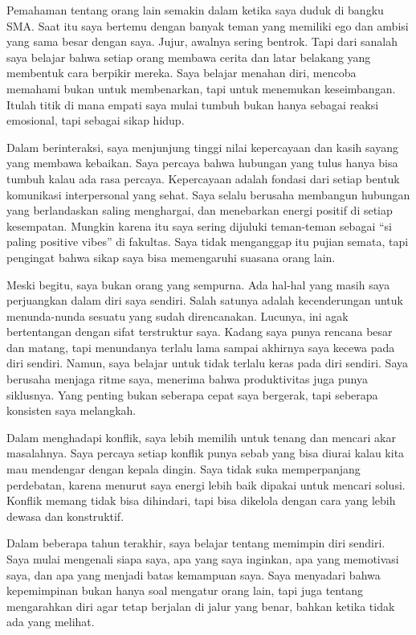 \documentclass[
  letterpaper,
  DIV=11,
  numbers=noendperiod]{scrreprt}
\begin{document}
Pemahaman tentang orang lain semakin dalam ketika saya duduk di bangku
SMA. Saat itu saya bertemu dengan banyak teman yang memiliki ego dan
ambisi yang sama besar dengan saya. Jujur, awalnya sering bentrok. Tapi
dari sanalah saya belajar bahwa setiap orang membawa cerita dan latar
belakang yang membentuk cara berpikir mereka. Saya belajar menahan diri,
mencoba memahami bukan untuk membenarkan, tapi untuk menemukan
keseimbangan. Itulah titik di mana empati saya mulai tumbuh bukan hanya
sebagai reaksi emosional, tapi sebagai sikap hidup.

Dalam berinteraksi, saya menjunjung tinggi nilai kepercayaan dan kasih
sayang yang membawa kebaikan. Saya percaya bahwa hubungan yang tulus
hanya bisa tumbuh kalau ada rasa percaya. Kepercayaan adalah fondasi
dari setiap bentuk komunikasi interpersonal yang sehat. Saya selalu
berusaha membangun hubungan yang berlandaskan saling menghargai, dan
menebarkan energi positif di setiap kesempatan. Mungkin karena itu saya
sering dijuluki teman-teman sebagai ``si paling positive vibes'' di
fakultas. Saya tidak menganggap itu pujian semata, tapi pengingat bahwa
sikap saya bisa memengaruhi suasana orang lain.

Meski begitu, saya bukan orang yang sempurna. Ada hal-hal yang masih
saya perjuangkan dalam diri saya sendiri. Salah satunya adalah
kecenderungan untuk menunda-nunda sesuatu yang sudah direncanakan.
Lucunya, ini agak bertentangan dengan sifat terstruktur saya. Kadang
saya punya rencana besar dan matang, tapi menundanya terlalu lama sampai
akhirnya saya kecewa pada diri sendiri. Namun, saya belajar untuk tidak
terlalu keras pada diri sendiri. Saya berusaha menjaga ritme saya,
menerima bahwa produktivitas juga punya siklusnya. Yang penting bukan
seberapa cepat saya bergerak, tapi seberapa konsisten saya melangkah.

Dalam menghadapi konflik, saya lebih memilih untuk tenang dan mencari
akar masalahnya. Saya percaya setiap konflik punya sebab yang bisa
diurai kalau kita mau mendengar dengan kepala dingin. Saya tidak suka
memperpanjang perdebatan, karena menurut saya energi lebih baik dipakai
untuk mencari solusi. Konflik memang tidak bisa dihindari, tapi bisa
dikelola dengan cara yang lebih dewasa dan konstruktif.

Dalam beberapa tahun terakhir, saya belajar tentang memimpin diri
sendiri. Saya mulai mengenali siapa saya, apa yang saya inginkan, apa
yang memotivasi saya, dan apa yang menjadi batas kemampuan saya. Saya
menyadari bahwa kepemimpinan bukan hanya soal mengatur orang lain, tapi
juga tentang mengarahkan diri agar tetap berjalan di jalur yang benar,
bahkan ketika tidak ada yang melihat.
\end{document}
